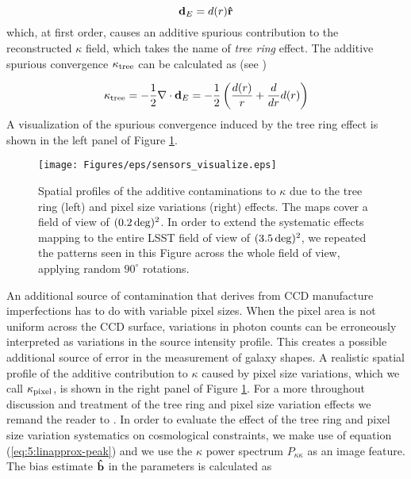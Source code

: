 \begin{equation}
\label{eq:7:displ}
\mathbf{d}_E = d(r)\mathbf{\hat{r}}
\end{equation}
%
which, at first order, causes an additive spurious contribution to the reconstructed $\kappa$ field, which takes the name of \textit{tree ring} effect. The additive spurious convergence $\kappa_{\rm tree}$ can be calculated as (see \citep{PetriCCD})

\begin{equation}
\label{eq:7:ktree}
\kappa_{\rm tree} = -\frac{1}{2}\nabla\cdot\mathbf{d}_E = -\frac{1}{2}\left(\frac{d(r)}{r}+\frac{d}{dr}d(r)\right)
\end{equation}   
%
A visualization of the spurious convergence induced by the tree ring effect is shown in the left panel of Figure \ref{fig:7:sensvis}. 
%
\begin{figure}
\begin{center}
\texttt{[image: Figures/eps/sensors\_visualize.eps]}
\end{center}
\caption{Spatial profiles of the additive contaminations to $\kappa$ due to the tree ring (left) and pixel size variations (right) effects. The maps cover a field of view of $(0.2\,{\rm deg})^2$. In order to extend the systematic effects mapping to the entire LSST field of view of $(3.5\,{\rm deg})^2$, we repeated the patterns seen in this Figure across the whole field of view, applying random $90^\circ$ rotations.}
\label{fig:7:sensvis}
\end{figure}
%
An additional source of contamination that derives from CCD manufacture imperfections has to do with variable pixel sizes. When the pixel area is not uniform across the CCD surface, variations in photon counts can be erroneously interpreted as variations in the source intensity profile. This creates a possible additional source of error in the measurement of galaxy shapes. A realistic spatial profile of the additive contribution to $\kappa$ caused by pixel size variations, which we call $\kappa_{\rm pixel}$, is shown in the right panel of Figure \ref{fig:7:sensvis}. For a more throughout discussion and treatment of the tree ring and pixel size variation effects we remand the reader to \citep{PetriCCD}. In order to evaluate the effect of the tree ring and pixel size variation systematics on cosmological constraints, we make use of equation (\ref{eq:5:linapprox-peak}) and we use the $\kappa$ power spectrum $P_{\kappa\kappa}$ as an image feature. The bias estimate $\mathbf{\hat{b}}$ in the parameters is calculated as 

